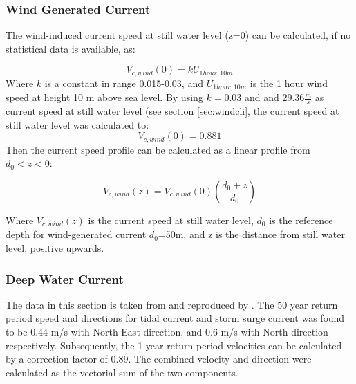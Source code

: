   \subsubsection{Wind Generated Current}
  The wind-induced current speed at still water level (z=0) can be calculated, if no statistical data is available, as:
  
  \begin{equation}
      V_{c,wind}(0)=k U_{1hour,10m}
  \end{equation}
  Where $k$ is a constant in range 0.015-0.03, and $U_{1hour,10m}$ is the 1 hour wind speed at height 10 m above sea level.\newline
  \newline
  By using $k=0.03$ and and 29.36$\frac{m}{s}$ as current speed at still water level (see section \ref{sec:windcli}, the current speed at still water level was calculated to:\newline
\newline
$$V_{c,wind}(0)=0.881$$   
  Then the current speed profile can be calculated as a linear profile from $d_0 < z < 0$:
  
  \begin{equation}
      V_{c,wind}(z)= V_{c,wind}(0) \left( \frac{d_0+z}{d_0}\right)
  \end{equation}
  
  \noindent Where $ V_{c,wind}(z)$ is the current speed at still water level, $d_0$ is the reference depth for wind-generated current $d_0$=50m, and z is the distance from still water level, positive upwards. \newline
  \newline
  
\subsubsection{Deep Water Current } 
 The data in this section is taken from \cite{hseenironmental} and reproduced by \cite{Lifes50+D1.1}.\newline
   \newline
   The 50 year return period speed and directions for tidal current and storm surge current was found to be 0.44 m/s with North-East direction, and 0.6 m/s with North direction respectively. Subsequently, the 1 year return period velocities can be calculated by a correction factor of 0.89. The combined velocity and direction were calculated as the vectorial sum of the two components.
   
